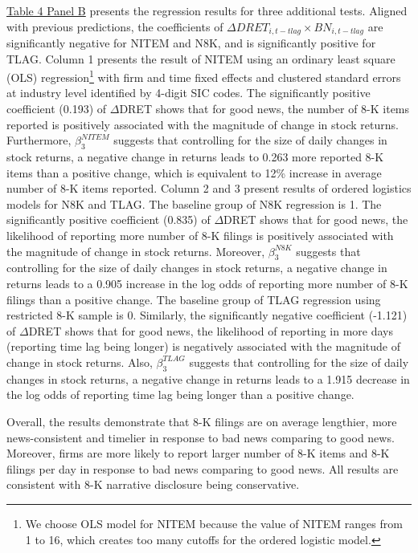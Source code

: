 \documentclass[a4paper]{article}
\begin{document}
\begin{spacing}{2}
\hyperref[T4PB]{Table 4 Panel B} presents the regression results for three additional tests. Aligned with previous predictions, the coefficients of $\Delta DRET_{i,t-tlag}\times BN_{i,t-tlag}$ are significantly negative for NITEM and N8K, and is significantly positive for TLAG. Column 1 presents the result of NITEM using an ordinary least square (OLS) regression\footnote{We choose OLS model for NITEM because the value of NITEM ranges from 1 to 16, which creates too many cutoffs for the ordered logistic model.} with firm and time fixed effects and clustered standard errors at industry level identified by 4-digit SIC codes. The significantly positive coefficient (0.193) of $\Delta$DRET shows that for good news, the number of 8-K items reported is positively associated with the magnitude of change in stock returns. Furthermore, $\beta_3^{NITEM}$ suggests that controlling for the size of daily changes in stock returns, a negative change in returns leads to 0.263 more reported 8-K items than a positive change, which is equivalent to 12\% increase in average number of 8-K items reported. Column 2 and 3 present results of ordered logistics models for N8K and TLAG. The baseline group of N8K regression is 1. The significantly positive coefficient (0.835) of $\Delta$DRET shows that for good news, the likelihood of reporting more number of 8-K filings is positively associated with the magnitude of change in stock returns. Moreover, $\beta_3^{N8K}$ suggests that controlling for the size of daily changes in stock returns, a negative change in returns leads to a 0.905 increase in the log odds of reporting more number of 8-K filings than a positive change. The baseline group of TLAG regression using restricted 8-K sample is 0. Similarly, the significantly negative coefficient (-1.121) of $\Delta$DRET shows that for good news, the likelihood of reporting in more days (reporting time lag being longer) is negatively associated with the magnitude of change in stock returns. Also, $\beta_3^{TLAG}$ suggests that controlling for the size of daily changes in stock returns, a negative change in returns leads to a 1.915 decrease in the log odds of reporting time lag being longer than a positive change. 

Overall, the results demonstrate that 8-K filings are on average lengthier, more news-consistent and timelier in response to bad news comparing to good news. Moreover, firms are more likely to report larger number of 8-K items and 8-K filings per day in response to bad news comparing to good news. All results are consistent with 8-K narrative disclosure being conservative.

\end{spacing}
\end{document}
